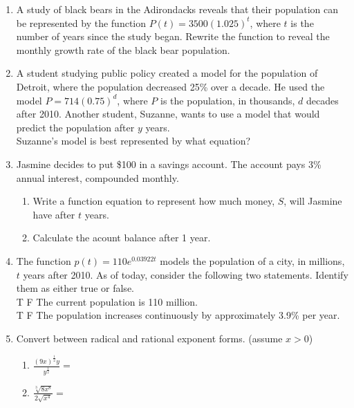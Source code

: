 \documentclass[12pt, twoside]{article}
\begin{document}
\begin{enumerate}[itemsep=0.5cm]
\newpage
\item A study of black bears in the Adirondacks reveals that their population can be represented by the function $P(t) = 3500(1.025)^t$, where $t$ is the number of years since the study began. Rewrite the function to reveal the monthly growth rate of the black bear population. %
\vspace{2cm}

\item A student studying public policy created a model for the population of Detroit, where the population decreased 25\% over a decade. He used the model $P = 714(0.75)^d$, where $P$ is the population, in thousands, $d$ decades after 2010. Another student, Suzanne, wants to use a model that would predict the population after $y$ years. \\[0.25cm]
Suzanne's model is best represented by what equation? \vspace{3cm}

\item Jasmine decides to put \$100 in a savings account. The account pays 3\% annual interest, compounded monthly. %
    \begin{enumerate}
        \item Write a function equation to represent how much money, $S$, will Jasmine have after $t$ years. \vspace{2cm}
        \item Calculate the acount balance after 1 year. \vspace{2cm}
    \end{enumerate}

\item The function $p(t) = 110e^{0.03922t}$ models the population of a city, in
millions, $t$ years after 2010. As of today, consider the following two
statements. Identify them as either true or false. \\[0.25cm]
T \; F \; The current population is 110 million. \\[0.25cm]
T \; F \; The population increases continuously by approximately
3.9\% per year. 

\newpage
\item Convert between radical and rational exponent forms. (assume $x > 0$)
    \begin{multicols}{2}
    \begin{enumerate}
        \item $\displaystyle \frac{(9x)^{\frac{1}{2}} y}{y^{\frac{1}{2}}} =$
        \item $\displaystyle \frac{\sqrt[3]{8x^8}}{2 \sqrt{x^4}} = $
    \end{enumerate}
    \end{multicols} \vspace{2cm}


\end{enumerate}
\end{document}
